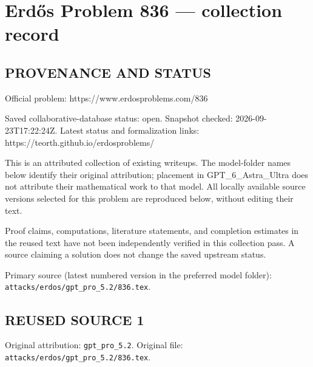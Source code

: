 \section*{Erd\H{o}s Problem 836 --- collection record}

\subsection*{PROVENANCE AND STATUS}
Official problem: https://www.erdosproblems.com/836

Saved collaborative-database status: open.
Snapshot checked: 2026-09-23T17:22:24Z.
Latest status and formalization links: https://teorth.github.io/erdosproblems/

This is an attributed collection of existing writeups. The model-folder names below identify their original attribution; placement in GPT\_6\_Astra\_Ultra does not attribute their mathematical work to that model. All locally available source versions selected for this problem are reproduced below, without editing their text.

Proof claims, computations, literature statements, and completion estimates in the reused text have not been independently verified in this collection pass. A source claiming a solution does not change the saved upstream status.

Primary source (latest numbered version in the preferred model folder): \texttt{attacks/erdos/gpt\_pro\_5.2/836.tex}.

\subsection*{REUSED SOURCE 1}
Original attribution: \texttt{gpt\_pro\_5.2}.
Original file: \texttt{attacks/erdos/gpt\_pro\_5.2/836.tex}.



